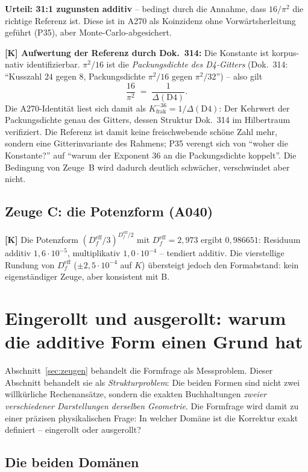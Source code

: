 \textbf{Urteil: 31:1 zugunsten additiv} -- bedingt durch die Annahme, dass
$16/\pi^2$ die richtige Referenz ist. Diese ist in A270 als Koinzidenz
ohne Vorw\"artsherleitung gef\"uhrt (P35), aber Monte-Carlo-abgesichert.

\textbf{[K] Aufwertung der Referenz durch Dok.~314:} Die Konstante ist
korpus-nativ identifizierbar. $\pi^2/16$ ist die
\emph{Packungsdichte des D4-Gitters} (Dok.~314: \enquote{Kusszahl $24$
gegen $8$, Packungsdichte $\pi^2/16$ gegen $\pi^2/32$}) -- also gilt
\[
  \frac{16}{\pi^2} \;=\; \frac{1}{\Delta(\mathrm{D4})}.
\]
Die A270-Identit\"at liest sich damit als
$K_\text{frak}^{-36} = 1/\Delta(\mathrm{D4})$: Der Kehrwert der
Packungsdichte genau des Gitters, dessen Struktur Dok.~314 im
Hilbertraum verifiziert. Die Referenz ist damit keine freischwebende
sch\"one Zahl mehr, sondern eine Gitterinvariante des Rahmens; P35
verengt sich von \enquote{woher die Konstante?} auf \enquote{warum der
Exponent $36$ an die Packungsdichte koppelt}. Die Bedingung von
Zeuge~B wird dadurch deutlich schw\"acher, verschwindet aber nicht.

\subsection{Zeuge C: die Potenzform (A040)}

\textbf{[K]} Die Potenzform $(D_f^\text{eff}/3)^{D_f^\text{eff}/2}$ mit
$D_f^\text{eff} = 2{,}973$ ergibt $0{,}986651$: Residuum additiv
$1{,}6\cdot10^{-5}$, multiplikativ $1{,}0\cdot10^{-4}$ -- tendiert
additiv. Die vierstellige Rundung von $D_f^\text{eff}$
($\pm2{,}5\cdot10^{-4}$ auf $K$) \"ubersteigt jedoch den Formabstand:
kein eigenst\"andiger Zeuge, aber konsistent mit B.


\section{Eingerollt und ausgerollt: warum die additive Form einen Grund hat}
\label{sec:eingerollt}

Abschnitt~\ref{sec:zeugen} behandelt die Formfrage
als Messproblem. Dieser Abschnitt behandelt sie als
\emph{Strukturproblem}: Die beiden Formen sind nicht zwei willk\"urliche
Rechenans\"atze, sondern die exakten Buchhaltungen \emph{zweier
verschiedener Darstellungen derselben Geometrie}. Die Formfrage wird
damit zu einer pr\"azisen physikalischen Frage: In welcher Dom\"ane ist
die Korrektur exakt definiert -- eingerollt oder ausgerollt?

\subsection{Die beiden Dom\"anen}

